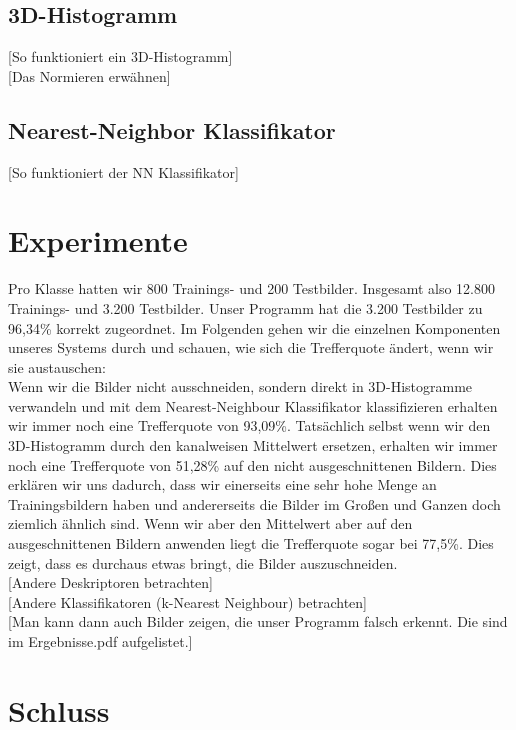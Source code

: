 \documentclass[a4,german]{article}
\begin{document}
\subsection{3D-Histogramm}
[So funktioniert ein 3D-Histogramm]\\

[Das Normieren erwähnen]

\subsection{Nearest-Neighbor Klassifikator}
[So funktioniert der NN Klassifikator]

\section{Experimente}
Pro Klasse hatten wir 800 Trainings- und 200 Testbilder. Insgesamt also 12.800 Trainings- und 3.200 Testbilder. Unser Programm hat die 3.200 Testbilder zu 96,34\% korrekt zugeordnet. Im Folgenden gehen wir die einzelnen Komponenten unseres Systems durch und schauen, wie sich die Trefferquote ändert, wenn wir sie austauschen:\\
Wenn wir die Bilder nicht ausschneiden, sondern direkt in 3D-Histogramme verwandeln und mit dem Nearest-Neighbour Klassifikator klassifizieren erhalten wir immer noch eine Trefferquote von 93,09\%. Tatsächlich selbst wenn wir den 3D-Histogramm durch den kanalweisen Mittelwert ersetzen, erhalten wir immer noch eine Trefferquote von 51,28\% auf den nicht ausgeschnittenen Bildern. Dies erklären wir uns dadurch, dass wir einerseits eine sehr hohe Menge an Trainingsbildern haben und andererseits die Bilder im Großen und Ganzen doch ziemlich ähnlich sind. Wenn wir aber den Mittelwert aber auf den ausgeschnittenen Bildern anwenden liegt die Trefferquote sogar bei 77,5\%. Dies zeigt, dass es durchaus etwas bringt, die Bilder auszuschneiden.\\

[Andere Deskriptoren betrachten]\\

[Andere Klassifikatoren (k-Nearest Neighbour) betrachten]\\

[Man kann dann auch Bilder zeigen, die unser Programm falsch erkennt. Die sind im Ergebnisse.pdf aufgelistet.]


\section{Schluss}
\end{document}
